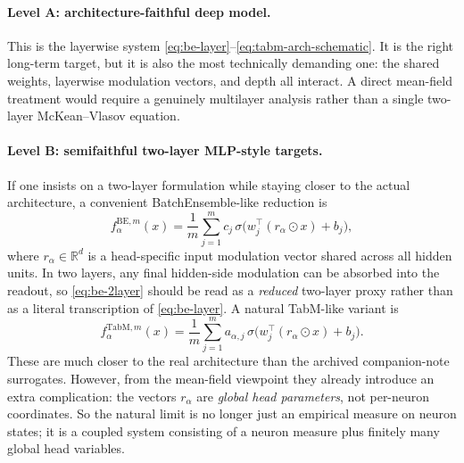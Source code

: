 \documentclass[11pt]{article}
\theoremstyle{definition}
\newcommand{\R}{\mathbb{R}}
\begin{document}
\paragraph{Level A: architecture-faithful deep model.}
This is the layerwise system \eqref{eq:be-layer}--\eqref{eq:tabm-arch-schematic}.
It is the right long-term target, but it is also the most technically demanding one:
the shared weights, layerwise modulation vectors, and depth all interact.
A direct mean-field treatment would require a genuinely multilayer analysis rather than a single two-layer McKean--Vlasov equation.

\paragraph{Level B: semifaithful two-layer MLP-style targets.}
If one insists on a two-layer formulation while staying closer to the actual architecture, a convenient BatchEnsemble-like reduction is
\begin{equation}
  f_{\alpha}^{\mathrm{BE},m}(x)
  =
  \frac1m\sum_{j=1}^m
  c_j\,\sigma\bigl(w_j^\top (r_\alpha\odot x)+b_j\bigr),
  \label{eq:be-2layer}
\end{equation}
where $r_\alpha\in\R^d$ is a head-specific input modulation vector shared across all hidden units.
In two layers, any final hidden-side modulation can be absorbed into the readout, so \eqref{eq:be-2layer} should be read as a \emph{reduced} two-layer proxy rather than as a literal transcription of \eqref{eq:be-layer}.
A natural TabM-like variant is
\begin{equation}
  f_{\alpha}^{\mathrm{TabM},m}(x)
  =
  \frac1m\sum_{j=1}^m
  a_{\alpha,j}\,\sigma\bigl(w_j^\top (r_\alpha\odot x)+b_j\bigr).
  \label{eq:tabm-2layer}
\end{equation}
These are much closer to the real architecture than the archived companion-note surrogates.
However, from the mean-field viewpoint they already introduce an extra complication:
the vectors $r_\alpha$ are \emph{global head parameters}, not per-neuron coordinates.
So the natural limit is no longer just an empirical measure on neuron states;
it is a coupled system consisting of a neuron measure plus finitely many global head variables.
\end{document}
